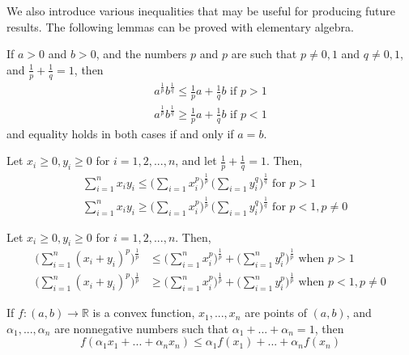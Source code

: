   We also introduce various inequalities that may be useful for producing future results. The following lemmas can be proved with elementary algebra. 

  \begin{lemma}
    If $a>0$ and $b>0$, and the numbers $p$ and $p$ are such that $p \neq 0, 1$ and $q \neq 0, 1$, and $\frac{1}{p} + \frac{1}{q} = 1$, then 
    \begin{align*}
        a^{\frac{1}{p}} b^{\frac{1}{q}} \leq \frac{1}{p} a + \frac{1}{q} b \text{  if } p > 1 \\
        a^{\frac{1}{p}} b^{\frac{1}{q}} \geq \frac{1}{p} a + \frac{1}{q} b \text{  if } p < 1
    \end{align*}
    and equality holds in both cases if and only if $a = b$. 
  \end{lemma}

  \begin{lemma}
    Let $x_i \geq 0, y_i \geq 0$ for $i = 1, 2, ..., n$, and let $\frac{1}{p} + \frac{1}{q} = 1$. Then, 
    \begin{align*}
        &\sum_{i=1}^n x_i y_i \leq \bigg( \sum_{i=1} x_i^p \bigg)^{\frac{1}{p}} \, \bigg( \sum_{i=1} y_i^q \bigg)^{\frac{1}{q}} \text{  for } p > 1 \\
        &\sum_{i=1}^n x_i y_i \geq \bigg( \sum_{i=1} x_i^p \bigg)^{\frac{1}{p}} \, \bigg( \sum_{i=1} y_i^q \bigg)^{\frac{1}{q}} \text{  for } p < 1, p \neq 0
    \end{align*}
  \end{lemma}

  \begin{lemma}
    Let $x_i \geq 0, y_i \geq 0$ for $i = 1, 2, ... ,n$. Then, 
    \begin{align*}
        \bigg( \sum_{i=1}^n (x_i + y_i)^p \bigg)^{\frac{1}{p}} & \leq \bigg( \sum_{i=1}^n x_i^p \bigg)^\frac{1}{p} + \bigg( \sum_{i=1}^n y_i^p \bigg)^{\frac{1}{p}} \text{  when } p > 1 \\
        \bigg( \sum_{i=1}^n (x_i + y_i)^p \bigg)^{\frac{1}{p}} & \geq \bigg( \sum_{i=1}^n x_i^p \bigg)^\frac{1}{p} + \bigg( \sum_{i=1}^n y_i^p \bigg)^{\frac{1}{p}} \text{  when } p < 1, p \neq 0
    \end{align*}
  \end{lemma}

  \begin{theorem}
    If $f: (a, b) \longrightarrow \mathbb{R}$ is a convex function, $x_1, ..., x_n$ are points of $(a, b)$, and $\alpha_1, ..., \alpha_n$ are nonnegative numbers such that $\alpha_1 + ... + \alpha_n = 1$, then 
    \[f(\alpha_1 x_1 + ... + \alpha_n x_n) \leq \alpha_1 f(x_1) + ... + \alpha_n f(x_n)\]
  \end{theorem}

